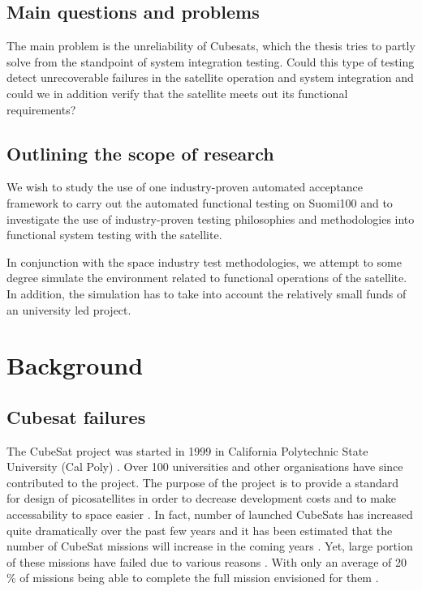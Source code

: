 \documentclass[english,12pt,a4paper,pdftex,elec,utf8]{aaltothesis}
\begin{document}
\subsection{Main questions and problems}
The main problem is the unreliability of Cubesats, which the thesis tries to partly solve from the standpoint of system integration testing. Could this type of testing detect unrecoverable failures in the satellite operation and system integration and could we in addition verify that the satellite meets out its functional requirements?
\subsection{Outlining the scope of research}
We wish to study the use of one industry-proven automated acceptance framework to carry out the automated functional testing on Suomi100 and to investigate the use of industry-proven testing philosophies and methodologies into functional system testing with the satellite.\par
In conjunction with the space industry test methodologies, we attempt to some degree simulate the environment related to functional operations of the satellite. In addition, the simulation has to take into account the relatively small funds of an university led project.\par




\clearpage

\section{Background}
\subsection{Cubesat failures}
The CubeSat project was started in 1999 in California Polytechnic State University (Cal Poly) \cite{cds}. Over 100 universities and other organisations have since contributed to the project. The purpose of the project is to provide a standard for design of picosatellites in order to decrease development costs and to make accessability to space easier \cite{cds}. In fact, number of launched CubeSats has increased quite dramatically over the past few years \cite{Swart2016} and it has been estimated that the number of CubeSat missions will increase in the coming years \cite{SpaceWorks2017}. Yet, large portion of these missions have failed due to various reasons \cite{Swart1, Swart2016, Swart2015}. With only an average of 20 \% of missions being able to complete the full mission envisioned for them \cite{Swart2016}. \par 
\end{document}

